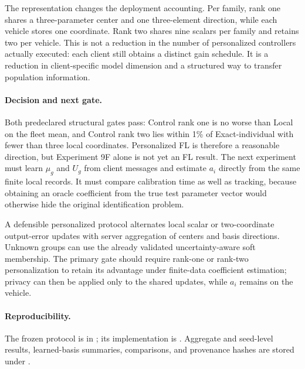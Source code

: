 The representation changes the deployment accounting. Per family, rank one
shares a three-parameter center and one three-element direction, while each
vehicle stores one coordinate. Rank two shares nine scalars per family and
retains two per vehicle. This is not a reduction in the number of personalized
controllers actually executed: each client still obtains a distinct gain
schedule. It is a reduction in client-specific model dimension and a structured
way to transfer population information.

\paragraph{Decision and next gate.}
Both predeclared structural gates pass: Control rank one is no worse than Local
on the fleet mean, and Control rank two lies within 1\% of Exact-individual with
fewer than three local coordinates. Personalized FL is therefore a reasonable
direction, but Experiment 9F alone is not yet an FL result. The next experiment
must learn $\mu_g$ and $U_g$ from client messages and estimate $a_i$ directly
from the same finite local records. It must compare calibration time as well as
tracking, because obtaining an oracle coefficient from the true test parameter
vector would otherwise hide the original identification problem.

A defensible personalized protocol alternates local scalar or two-coordinate
output-error updates with server aggregation of centers and basis directions.
Unknown groups can use the already validated uncertainty-aware soft membership.
The primary gate should require rank-one or rank-two personalization to retain
its advantage under finite-data coefficient estimation; privacy can then be
applied only to the shared updates, while $a_i$ remains on the vehicle.

\paragraph{Reproducibility.}
The frozen protocol is in ; its implementation
is . Aggregate and
seed-level results, learned-basis summaries, comparisons, and provenance hashes
are stored under .
